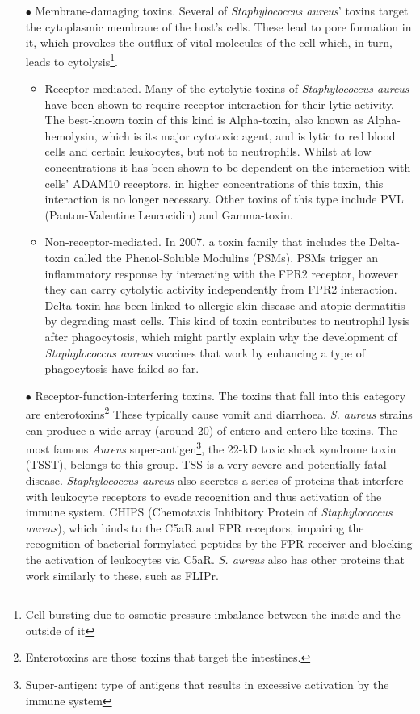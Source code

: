 \begin{itemize}
\item[$\bullet$] Membrane-damaging toxins. Several of \emph{Staphylococcus aureus}' toxins target the cytoplasmic membrane of the host's cells. These lead to pore formation in it, which provokes the outflux of vital molecules of the cell which, in turn, leads to cytolysis\footnote{Cell bursting due to osmotic pressure imbalance between the inside and the outside of it}.
   \begin{itemize}
        \item Receptor-mediated. Many of the cytolytic toxins of \emph{Staphylococcus aureus} have been shown to require receptor interaction for their lytic activity. The best-known toxin of this kind is Alpha-toxin, also known as Alpha-hemolysin, which is its major cytotoxic agent, and is lytic to red blood cells and certain leukocytes, but not to neutrophils. Whilst at low concentrations it has been shown to be dependent on the interaction with cells' ADAM10 receptors, in higher concentrations of this toxin, this interaction is no longer necessary. Other toxins of this type include  PVL (Panton-Valentine Leucocidin) and Gamma-toxin.
        \item Non-receptor-mediated. In 2007, a toxin family that includes the Delta-toxin called the Phenol-Soluble Modulins (PSMs). PSMs trigger an inflammatory response by interacting with the FPR2 receptor, however they can carry cytolytic activity independently from FPR2 interaction. Delta-toxin has been linked to allergic skin disease and atopic dermatitis by degrading mast cells. This kind of toxin contributes to neutrophil lysis after phagocytosis, which might partly explain why the development of \emph{Staphylococcus aureus} vaccines that work by enhancing a type of phagocytosis have failed so far. 
   \end{itemize}
\item[$\bullet$] Receptor-function-interfering toxins. The toxins that fall into this category are enterotoxins\footnote{Enterotoxins are those toxins that target the intestines.} These typically cause vomit and diarrhoea. \emph{S. aureus} strains can produce a wide array (around 20) of entero and entero-like toxins. The most famous \emph{Aureus} super-antigen\footnote{Super-antigen: type of antigens that results in excessive activation by the immune system}, the 22-kD toxic shock syndrome toxin (TSST), belongs to this group. TSS is a very severe and potentially fatal disease. \emph{Staphylococcus aureus} also secretes a series of proteins that interfere with leukocyte receptors to evade recognition and thus activation of the immune system. CHIPS (Chemotaxis Inhibitory Protein of \emph{Staphylococcus aureus}), which binds to the C5aR and FPR receptors, impairing the recognition of bacterial formylated peptides by the FPR receiver and blocking the activation of leukocytes via C5aR. \emph{S. aureus} also has other proteins that work similarly to these, such as FLIPr.

\end{itemize}
